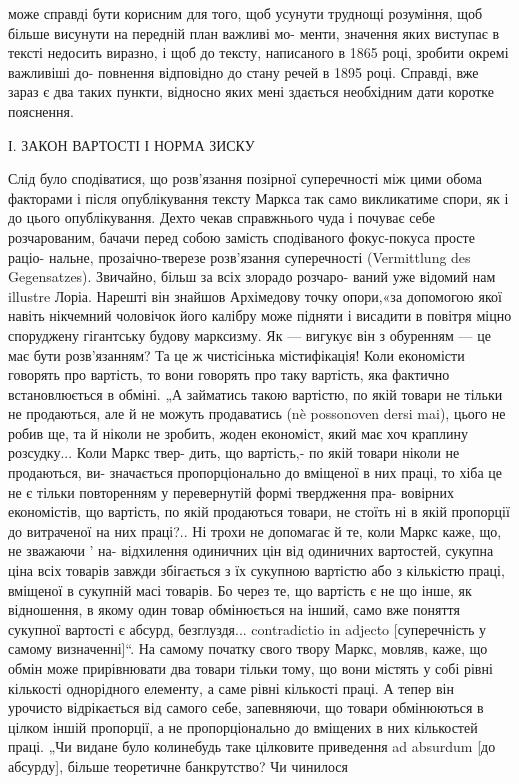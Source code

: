 \parcont{}  %
може справді бути корисним для того, щоб усунути труднощі розуміння, щоб більше висунути на
передній план важливі мо- менти, значення яких виступає в тексті недосить виразно, і щоб до
тексту, написаного в 1865 році, зробити окремі важливіші до- повнення відповідно до стану речей в
1895 році. Справді, вже зараз є два таких пункти, відносно яких мені здається необхідним дати
коротке пояснення.

І. ЗАКОН ВАРТОСТІ І НОРМА ЗИСКУ

Слід було сподіватися, що розв’язання позірної суперечності між цими обома факторами і після
опублікування тексту Маркса так само викликатиме спори, як і до цього опублікування. Дехто чекав
справжнього чуда і почуває себе розчарованим, бачачи перед собою замість сподіваного фокус-покуса
просте раціо- нальне, прозаічно-тверезе розв’язання суперечності (Vermittlung
des Gegensatzes). Звичайно, більш за всіх злорадо розчаро- ваний уже відомий нам illustre Лоріа.
Нарешті він знайшов Архімедову точку опори,«за допомогою якої навіть нікчемний чоловічок його
калібру може підняти і висадити в повітря міцно споруджену гігантську будову марксизму. Як —
вигукує він з обуренням — це має бути розв’язанням? Та це ж чистісінька містифікація! Коли
економісти говорять про вартість, то вони говорять про таку вартість, яка фактично встановлюється
в обміні. „А займатись такою вартістю, по якій товари не тільки не продаються, але й не можуть
продаватись (nè possonoven dersi mai), цього не робив ще, та й ніколи не зробить, жоден
економіст, який має хоч краплину розсудку... Коли Маркс твер- дить, що вартість,- по якій товари
ніколи не продаються, ви- значається пропорціонально до вміщеної в них праці, то хіба це не є тільки повторенням у перевернутій формі твердження пра- вовірних економістів, що вартість, по
якій продаються товари, не стоїть ні в якій пропорції до витраченої на них праці?..  Ні трохи не
допомагає й те, коли Маркс каже, що, не зважаючи '
на- відхилення одиничних цін від одиничних вартостей, сукупна ціна всіх товарів завжди збігається
з їх сукупною вартістю або з кількістю праці, вміщеної в сукупній масі товарів. Бо через те, що
вартість є не що інше, як відношення, в якому один товар обмінюється на інший, само вже поняття
сукупної вартості є абсурд, безглуздя... contradictio in adjecto [суперечність у самому визначенні]“. На самому початку свого твору Маркс, мовляв, каже, що обмін може прирівнювати два товари
тільки тому, що вони містять у собі рівні кількості однорідного елементу, а саме рівні кількості
праці. А тепер він урочисто відрікається від самого себе, запевняючи, що товари обмінюються в
цілком іншій пропорції, а не
пропорціонально до вміщених в них кількостей праці. „Чи видане було колинебудь таке цілковите
приведення ad absurdum [до абсурду], більше теоретичне банкрутство? Чи чинилося
\parbreak{}  %
